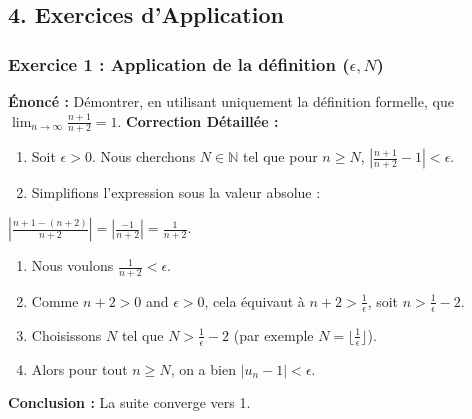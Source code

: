 \documentclass[a4paper,11pt]{report}
\begin{document}
\subsection*{4. Exercices d'Application}

\subsubsection*{Exercice 1 : Application de la définition ($\epsilon, N$)}
\textbf{Énoncé :} Démontrer, en utilisant uniquement la définition formelle, que $\lim_{n \to \infty} \frac{n+1}{n+2} = 1$.
\textbf{Correction Détaillée :}
\begin{enumerate}
\item Soit $\epsilon > 0$. Nous cherchons $N \in \mathbb{N}$ tel que pour $n \ge N$, $|\frac{n+1}{n+2} - 1| < \epsilon$.

\item Simplifions l'expression sous la valeur absolue :
\end{enumerate}
   $|\frac{n+1 - (n+2)}{n+2}| = |\frac{-1}{n+2}| = \frac{1}{n+2}$.
\begin{enumerate}
\item Nous voulons $\frac{1}{n+2} < \epsilon$.

\item Comme $n+2 > 0$ and $\epsilon > 0$, cela équivaut à $n+2 > \frac{1}{\epsilon}$, soit $n > \frac{1}{\epsilon} - 2$.

\item Choisissons $N$ tel que $N > \frac{1}{\epsilon} - 2$ (par exemple $N = \lfloor \frac{1}{\epsilon} \rfloor$).

\item Alors pour tout $n \ge N$, on a bien $|u_n - 1| < \epsilon$.
\end{enumerate}
\textbf{Conclusion :} La suite converge vers 1.
\end{document}
